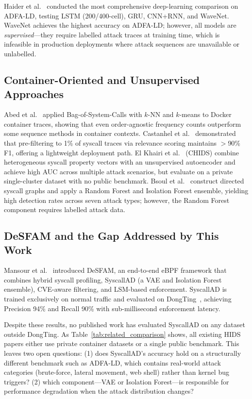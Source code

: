 Haider et al.~\cite{haider2021deep} conducted the most comprehensive deep-learning
comparison on ADFA-LD, testing LSTM (200/400-cell), GRU, CNN+RNN, and WaveNet.
WaveNet achieves the highest accuracy on ADFA-LD; however, all models are
\textit{supervised}---they require labelled attack traces at training time, which is
infeasible in production deployments where attack sequences are unavailable or
unlabelled.

\subsection{Container-Oriented and Unsupervised Approaches}
\label{subsec:container}

Abed et al.~\cite{abed2015bag} applied Bag-of-System-Calls with $k$-NN and $k$-means
to Docker container traces, showing that even order-agnostic frequency counts
outperform some sequence methods in container contexts. Castanhel et
al.~\cite{castanhel2021peek} demonstrated that pre-filtering to 1\% of syscall traces
via relevance scoring maintains $>$90\% F1, offering a lightweight deployment path.
El Khairi et al.~\cite{elkhairi2022chids} (CHIDS) combine heterogeneous syscall property
vectors with an unsupervised autoencoder and achieve high AUC across multiple attack
scenarios, but evaluate on a private single-cluster dataset with no public benchmark.
Bsoul et al.~\cite{bsoul2022ensemble} construct directed syscall graphs and apply a
Random Forest and Isolation Forest ensemble, yielding high detection rates across seven
attack types; however, the Random Forest component requires labelled attack data.

\subsection{DeSFAM and the Gap Addressed by This Work}
\label{subsec:desfam_gap}

Mansour et al.~\cite{desfam_original} introduced DeSFAM, an end-to-end eBPF framework
that combines hybrid syscall profiling, SyscallAD (a VAE and Isolation Forest ensemble),
CVE-aware filtering, and LSM-based enforcement. SyscallAD is trained exclusively on normal
traffic and evaluated on DongTing~\cite{ref26_dongtingdataset}, achieving Precision 94\%
and Recall 90\% with sub-millisecond enforcement latency.

Despite these results, no published work has evaluated SyscallAD on any dataset outside
DongTing. As Table~\ref{tab:related_comparison} shows, all existing HIDS papers either use
private container datasets or a single public benchmark. This leaves two open questions:
(1) does SyscallAD's accuracy hold on a structurally different benchmark such as ADFA-LD,
which contains real-world attack categories (brute-force, lateral movement, web shell)
rather than kernel bug triggers? (2) which component---VAE or Isolation Forest---is
responsible for performance degradation when the attack distribution changes?

